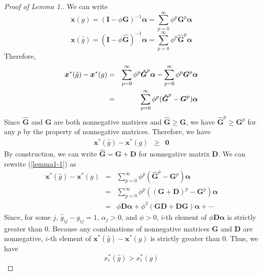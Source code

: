 \documentclass[12pt]{article}
\theoremstyle{definition}
\newcommand{\bm}[1]{\boldsymbol{#1}}
\begin{document}
\begin{proof}[Proof of Lemma 1.]
	We can write
	\[ \bm{x}(g) = {(\bm{I} - \phi \bm{G})}^{-1} \bm{\alpha} = \sum_{p=0}^{\infty} \phi^p \bm{G}^p \bm{\alpha} \]
	\[ \bm{x}(\hat{g}) = {(\bm{I} - \phi \bm{\hat{G}})}^{-1} \bm{\alpha} = \sum_{p=0}^{\infty} \phi^p \bm{\hat{G}}^p \bm{\alpha} \]
	Therefore,
	\begin{eqnarray}
		\label{lemma1-1}
		\bm{x}^*(\hat{g}) - \bm{x}^*(g) &=& \sum_{p=0}^{\infty} \phi^p \bm{\hat{G}}^p \bm{\alpha} - \sum_{p=0}^{\infty} \phi^p \bm{G}^p \bm{\alpha} \notag \\
										&=& \sum_{p=0}^{\infty} \phi^p (\bm{\hat{G}}^p - \bm{G}^p) \bm{\alpha} \notag 
	\end{eqnarray}
	Since $\bm{\hat{G}}$ and $\bm{G}$ are both nonnegative matrices and $\bm{\hat{G}} \ge \bm{G}$, we have $\bm{\hat{G}}^p \ge \bm{G}^p$ for any $p$ by the property of nonnegative matrices.
	Therefore, we have
	\begin{eqnarray*}
		\bm{x}^*(\hat{g}) - \bm{x}^*(g) &\ge& \bm{0}
	\end{eqnarray*}
	By construction, we can write $\bm{\hat{G}} = \bm{G} + \bm{D}$ for nonnegative matrix $\bm{D}$.
	We can rewrite (\ref{lemma1-1}) as
	\begin{eqnarray*}
		\bm{x}^*(\hat{g}) - \bm{x}^*(g) &=& \sum_{p=0}^{\infty} \phi^p (\bm{\hat{G}}^p - \bm{G}^p) \bm{\alpha} \\
										&=& \sum_{p=0}^{\infty} \phi^p ((\bm{G} + \bm{D})^p - \bm{G}^p) \bm{\alpha} \\
										&=& \phi \bm{D} \bm{\alpha} + \phi^2 (\bm{G} \bm{D} + \bm{D} \bm{G}) \bm{\alpha} + \cdots
	\end{eqnarray*}
	Since, for some $j$, $\hat{g}_{ij} - g_{ij} = 1$, $\alpha_j > 0$, and $\phi > 0$, $i$-th element of $\phi \bm{D} \bm{\alpha}$ is strictly greater than $0$.
	Because any combinations of nonnegative matrices $\bm{G}$ and $\bm{D}$ are nonnegative, $i$-th element of $\bm{x}^*(\hat{g}) - \bm{x}^*(g)$ is strictly greater than $0$.
	Thus, we have
	\[ x_i^*(\hat{g}) > x_i^*(g) \]
\end{proof}
\end{document}
